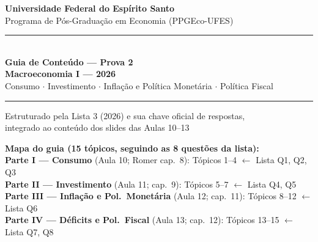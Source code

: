\documentclass[12pt, a4paper]{article}
\begin{document}

\begin{titlepage}
\begin{center}
\vspace*{1.2cm}
{\Large\bfseries Universidade Federal do Espírito Santo}\\[0.5em]
{\large Programa de Pós-Graduação em Economia (PPGEco-UFES)}\\[2em]

\rule{\linewidth}{1.2pt}\\[0.8em]
{\LARGE\bfseries\color{cyanrbc} Guia de Conteúdo --- Prova 2\\[0.4em]
\large Macroeconomia I --- 2026}\\[0.4em]
{\normalsize\color{grayrbc} Consumo $\cdot$ Investimento $\cdot$ Inflação e Política Monetária $\cdot$ Política Fiscal}\\[0.8em]
\rule{\linewidth}{1.2pt}

\vspace{1em}
{\large Estruturado pela Lista 3 (2026) e sua chave oficial de respostas,\\
integrado ao conteúdo dos slides das Aulas 10--13}

\vspace{1.5em}
\begin{tcolorbox}[standard, colback=provabg, colframe=provaborder, width=0.92\textwidth,
  arc=4pt, boxrule=1.2pt, left=8pt, right=8pt, top=6pt, bottom=6pt]
\raggedright
\textbf{\textcolor{provaborder}{Mapa do guia} (15 tópicos, seguindo as 8 questões da lista):}\\[0.4em]
\textbf{Parte I --- Consumo} (Aula 10; Romer cap.\ 8): Tópicos 1--4
\hfill $\leftarrow$ Lista Q1, Q2, Q3\\
\textbf{Parte II --- Investimento} (Aula 11; cap.\ 9): Tópicos 5--7
\hfill $\leftarrow$ Lista Q4, Q5\\
\textbf{Parte III --- Inflação e Pol.\ Monetária} (Aula 12; cap.\ 11): Tópicos 8--12
\hfill $\leftarrow$ Lista Q6\\
\textbf{Parte IV --- Déficits e Pol.\ Fiscal} (Aula 13; cap.\ 12): Tópicos 13--15
\hfill $\leftarrow$ Lista Q7, Q8
\end{tcolorbox}


\end{center}
\end{titlepage}
\end{document}
